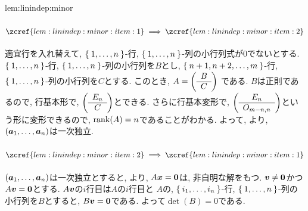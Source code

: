 \begin{proofof}{lem:linindep:minor}
\paragraph{$\zcref{lem:linindep:minor:item:1}\implies\zcref{lem:linindep:minor:item:2}$}
適宜行を入れ替えて,
$\Set{1,\ldots,n}$-行, $\Set{1,\ldots,n}$-列の小行列式が$0$でないとする.
$\Set{1,\ldots,n}$-行, $\Set{1,\ldots,n}$-列の小行列を$B$とし,
$\Set{n+1,n+2,\ldots, m}$-行, $\Set{1,\ldots,n}$-列の小行列を$C$とする.
このとき,
$A=\left(\begin{array}{c}B\\\hline C\end{array}\right)$
である.
$B$は正則であるので,
 行基本形で,
$\left(\begin{array}{c}E_n\\\hline C\end{array}\right)$とできる.
 さらに行基本変形で, $\left(\begin{array}{c}E_n\\\hline O_{m-n,n}\end{array}\right)$という形に変形できるので,
 $\operatorname{rank}(A)=n$であることがわかる.
 よって,
 より,
 $(\boldsymbol{a}_1,\ldots,\boldsymbol{a}_n)$は一次独立.

\paragraph{$\zcref{lem:linindep:minor:item:2}\implies\zcref{lem:linindep:minor:item:1}$}

$(\boldsymbol{a}_1,\ldots,\boldsymbol{a}_n)$は一次独立とすると,
より,
$A\boldsymbol{x}=\boldsymbol{0}$は, 非自明な解をもつ.
$\boldsymbol{v}\neq\boldsymbol{0}$かつ$A\boldsymbol{v}=\boldsymbol{0}$とする.
$A\boldsymbol{v}$の$i$行目は$A$の$i$行目と%
$A$の,
$\Set{i_1,\ldots,i_n}$-行,
$\Set{1,\ldots,n}$-列の小行列を$B$とすると,
$B\boldsymbol{v}=\boldsymbol{0}$である.
よって$\det(B)=0$である.
\end{proofof}

\endinput
\section{逆行列や正則に関する命題の証明}
ここでは, \zcref{chap:inverse}に現れる命題の証明を行う.
逆行列や正則行列に関する命題については,
一般の正方行列の場合について証明をしているので,
煩雑になっている部分がある.
$2$-次正方行列の場合のみについて証明をするのであれば,
直接計算をすることで示すほうが手っ取り早いものが多い.
行列式に関する命題は,
行列式を$2$次正方行列にしかここでは定義していないこともあり,
$2$-次正方行列の場合のみについて証明をしている.





